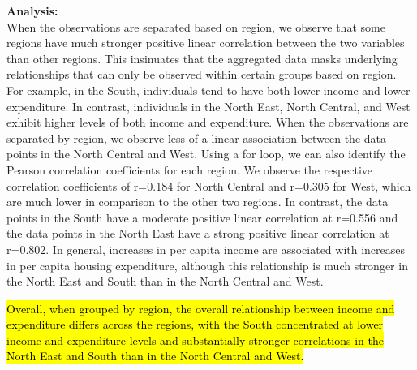 \documentclass[12pt,letterpaper]{article}
\begin{document}
\begin{itemize}
		\textbf{Analysis:}\\
		When the observations are separated based on region, we observe that some regions have much stronger positive linear correlation between the two variables than other regions. This insinuates that the aggregated data masks underlying relationships that can only be observed within certain groups based on region. For example, in the South, individuals tend to have both lower income and lower expenditure. In contrast, individuals in the North East, North Central, and West exhibit higher levels of both income and expenditure. When the observations are separated by region, we observe less of a linear association between the data points in the North Central and West. Using a for loop, we can also identify the Pearson correlation coefficients for each region. We observe the respective correlation coefficients of r=0.184 for North Central and r=0.305 for West, which are much lower in comparison to the other two regions. In contrast, the data points in the South have a moderate positive linear correlation at r=0.556 and the data points in the North East have a strong positive linear correlation at r=0.802. In general, increases in per capita income are associated with increases in per capita housing expenditure, although this relationship is much stronger in the North East and South than in the North Central and West.
		
		\hl{Overall, when grouped by region, the overall relationship between income and expenditure differs across the regions, with the South concentrated at lower income and expenditure levels and substantially stronger correlations in the North East and South than in the North Central and West.}


	\end{itemize}
	
	
\end{document}
